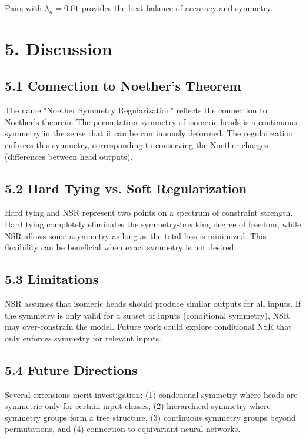 \documentclass[12pt]{article}
\begin{document}
Pairs with $\lambda_n = 0.01$ provides the best balance of accuracy and symmetry.

\section{5. Discussion}

\subsection{5.1 Connection to Noether's Theorem}

The name "Noether Symmetry Regularization" reflects the connection to Noether's theorem. The permutation symmetry of isomeric heads is a continuous symmetry in the sense that it can be continuously deformed. The regularization enforces this symmetry, corresponding to conserving the Noether charges (differences between head outputs).

\subsection{5.2 Hard Tying vs. Soft Regularization}

Hard tying and NSR represent two points on a spectrum of constraint strength. Hard tying completely eliminates the symmetry-breaking degree of freedom, while NSR allows some asymmetry as long as the total loss is minimized. This flexibility can be beneficial when exact symmetry is not desired.

\subsection{5.3 Limitations}

NSR assumes that isomeric heads should produce similar outputs for all inputs. If the symmetry is only valid for a subset of inputs (conditional symmetry), NSR may over-constrain the model. Future work could explore conditional NSR that only enforces symmetry for relevant inputs.

\subsection{5.4 Future Directions}

Several extensions merit investigation: (1) conditional symmetry where heads are symmetric only for certain input classes, (2) hierarchical symmetry where symmetry groups form a tree structure, (3) continuous symmetry groups beyond permutations, and (4) connection to equivariant neural networks.
\end{document}
